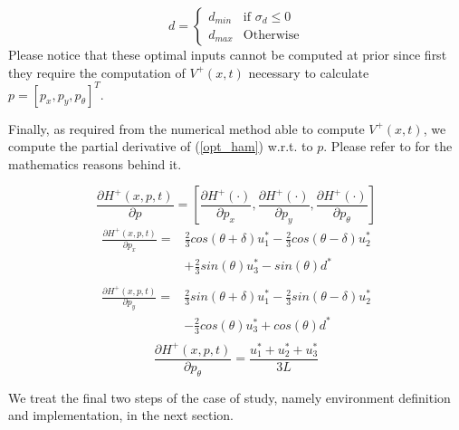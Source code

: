 \begin{equation*}
  d= 
	\begin{cases} 
		d_{min} &\text{if } \sigma_{d} \leq 0\\
		d_{max} &\text{Otherwise} 
	\end{cases}
\end{equation*}
Please notice that these optimal inputs cannot be computed at prior since first they require the computation of $V^+(x,t)$ necessary to calculate $p = [p_x, p_y, p_{\theta}]^T$.

Finally, as required from the numerical method able to compute $V^+(x,t)$, we compute the partial derivative of (\ref{opt_ham}) w.r.t. to $p$. Please refer to \cite{new_paper} \cite{mitch_phd} for the mathematics reasons behind it.

\begin{equation}
  \frac{\partial H^+(x,p,t)}{\partial p} = 
    \left[
      \frac{\partial H^+(\cdot)}{\partial p_x},
      \frac{\partial H^+(\cdot)}{\partial p_y},
      \frac{\partial H^+(\cdot)}{\partial p_{\theta}}    
    \right]
\end{equation}
\begin{equation*}
  \begin{split}
    \frac{\partial H^+(x,p,t)}{\partial p_x} =
    &
    \frac{2}{3}cos(\theta+\delta)u_1^* - \frac{2}{3}cos(\theta-\delta)u_2^* \\
    &
    + \frac{2}{3}sin(\theta)u_3^* - sin(\theta)d^* \\
  \end{split}
\end{equation*}
\begin{equation*}
  \begin{split}
    \frac{\partial H^+(x,p,t)}{\partial p_y} =
    &
    \frac{2}{3}sin(\theta+\delta)u_1^* - \frac{2}{3}sin(\theta-\delta)u_2^* \\
    &
    - \frac{2}{3}cos(\theta)u_3^* + cos(\theta)d^* \\
  \end{split}
\end{equation*}
\begin{equation*}
    \frac{\partial H^+(x,p,t)}{\partial p_{\theta}} = \frac{u_1^* + u_2^* + u_3^*}{3L} 
\end{equation*}

We treat the final two steps of the case of study, namely environment definition and implementation, in the next section.

